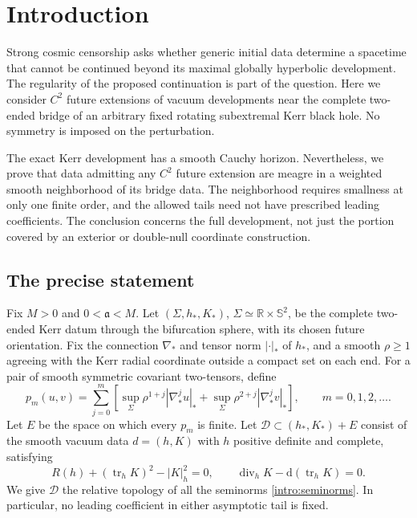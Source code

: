 \section{Introduction}\label{sec:introduction}

Strong cosmic censorship asks whether generic initial data determine a
spacetime that cannot be continued beyond its maximal globally hyperbolic
development. The regularity of the proposed continuation is part of the
question. Here we consider \(C^2\) future extensions of vacuum developments
near the complete two-ended bridge of an arbitrary fixed rotating
subextremal Kerr black hole. No symmetry is imposed on the perturbation.

The exact Kerr development has a smooth Cauchy horizon. Nevertheless,
we prove that data admitting any \(C^2\) future extension are meagre in
a weighted smooth neighborhood of its bridge data. The neighborhood
requires smallness at only one finite order, and the allowed tails need
not have prescribed leading coefficients. The conclusion concerns the
full development, not just the portion covered by an exterior or
double-null coordinate construction.

\subsection{The precise statement}

Fix \(M>0\) and \(0<\mathfrak a<M\). Let
\((\Sigma,h_*,K_*)\), \(\Sigma\simeq\mathbb R\times\mathbb S^2\),
be the complete two-ended Kerr datum through the bifurcation sphere,
with its chosen future orientation. Fix the connection \(\nabla_*\)
and tensor norm \(|\cdot|_*\) of \(h_*\), and a smooth
\(\rho\geq1\) agreeing with the Kerr radial coordinate outside a compact
set on each end. For a pair of smooth symmetric covariant two-tensors,
define
\begin{equation}\label{intro:seminorms}
 p_m(u,v)=\sum_{j=0}^{m}\left[
 \sup_\Sigma\rho^{1+j}|\nabla_*^j u|_*
 +\sup_\Sigma\rho^{2+j}|\nabla_*^j v|_*\right],
 \qquad m=0,1,2,\ldots.
\end{equation}
Let \(E\) be the space on which every \(p_m\) is finite. Let
\(\mathcal D\subset(h_*,K_*)+E\) consist of the smooth vacuum data
\(d=(h,K)\) with \(h\) positive definite and complete, satisfying
\begin{equation}\label{intro:constraints}
 R(h)+(\operatorname{tr}_hK)^2-|K|_h^2=0,
 \qquad \operatorname{div}_hK-\mathrm d(\operatorname{tr}_hK)=0.
\end{equation}
We give \(\mathcal D\) the relative topology of all the seminorms
\eqref{intro:seminorms}. In particular, no leading coefficient in either
asymptotic tail is fixed.

